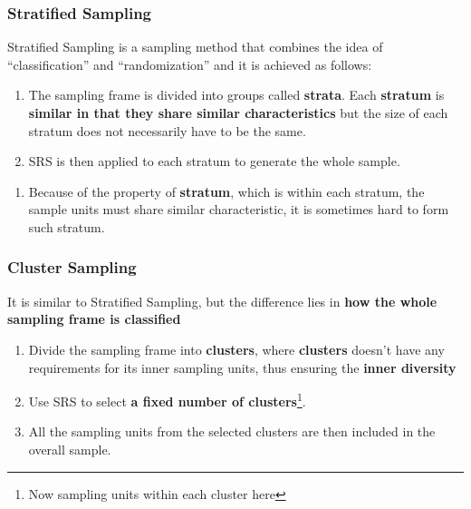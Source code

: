 \documentclass[math,code]{amznotes}
\theoremstyle{remark}
\begin{document}
\subsubsection{Stratified Sampling}
Stratified Sampling is a sampling method that combines the idea of ``classification'' and ``randomization'' and it is achieved as follows:
\begin{enumerate}
    \item The sampling frame is divided into groups called \textbf{strata}. Each \textbf{stratum} is \textbf{similar in that they share similar characteristics} but the size of each stratum does not necessarily have to be the same.
    \item SRS is then applied to each stratum to generate the whole sample.
\end{enumerate}
\begin{notebox}
    \begin{enumerate}
        \item Because of the property of \textbf{stratum}, which is within each stratum, the sample units must share similar characteristic, it is sometimes hard to form such stratum.
    \end{enumerate}
\end{notebox}

\subsubsection{Cluster Sampling}
It is similar to Stratified Sampling, but the difference lies in \textbf{how the whole sampling frame is classified}
\begin{enumerate}
    \item Divide the sampling frame into \textbf{clusters}, where \textbf{clusters} doesn't have any requirements for its inner sampling units, thus ensuring the \textbf{inner diversity}
    \item Use SRS to select \textbf{a fixed number of clusters}\footnote{Now sampling units within each cluster here}.
    \item All the sampling units from the selected clusters are then included in the overall sample.
\end{enumerate}
\end{document}
